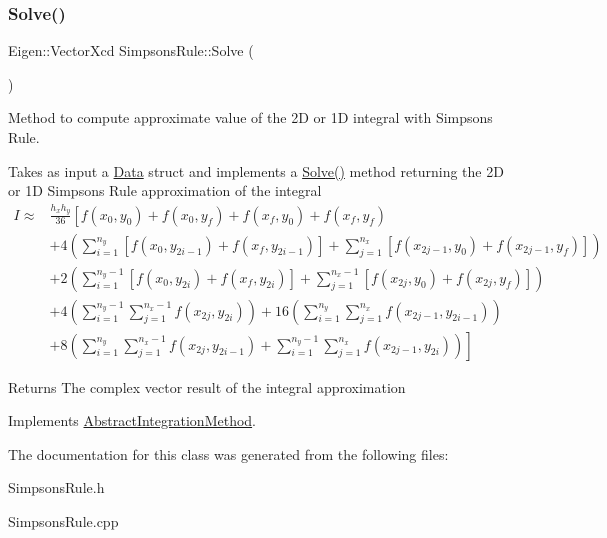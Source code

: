 \subsubsection{\texorpdfstring{Solve()}{Solve()}}
{\footnotesize\ttfamily Eigen\+::\+Vector\+Xcd Simpsons\+Rule\+::\+Solve (\begin{DoxyParamCaption}{ }\end{DoxyParamCaption})\hspace{0.3cm}{\ttfamily [virtual]}}



Method to compute approximate value of the 2D or 1D integral with Simpson\textquotesingle{}s Rule. 

Takes as input a \hyperlink{struct_data}{Data} struct and implements a \hyperlink{class_simpsons_rule_a9925b07e44be9fc1644d3cbeb742078c}{Solve()} method returning the 2D or 1D Simpson\textquotesingle{}s Rule approximation of the integral \begin{eqnarray*} I \approx & \frac{h_x h_y}{36} \left[ f(x_0, y_0)+f(x_0,y_f)+f(x_f,y_0)+f(x_f,y_f) \right.\\ & + 4 \left( \sum_{i=1}^{n_y} \left[f(x_0, y_{2i-1})+f(x_f,y_{2i-1})\right] + \sum_{j=1}^{n_x} \left[f(x_{2j-1}, y_0)+f(x_{2j-1},y_f)\right] \right)\\ & + 2 \left( \sum_{i=1}^{n_y-1} \left[f(x_0, y_{2i})+f(x_f,y_{2i})\right] + \sum_{j=1}^{n_x-1} \left[f(x_{2j}, y_0)+f(x_{2j},y_f)\right] \right) \\ & + 4 \left( \sum_{i=1}^{n_y-1} \sum_{j=1}^{n_x-1} f(x_{2j}, y_{2i}) \right) + 16 \left( \sum_{i=1}^{n_y} \sum_{j=1}^{n_x} f(x_{2j-1}, y_{2i-1}) \right) \\ & \left. +8 \left( \sum_{i=1}^{n_y} \sum_{j=1}^{n_x-1} f(x_{2j}, y_{2i-1}) + \sum_{i=1}^{n_y-1} \sum_{j=1}^{n_x} f(x_{2j-1}, y_{2i}) \right) \right] \end{eqnarray*}

\begin{DoxyReturn}{Returns}
The complex vector result of the integral approximation 
\end{DoxyReturn}


Implements \hyperlink{class_abstract_integration_method_af76e5bdce7d0b139d07e920fa29c1c34}{Abstract\+Integration\+Method}.



The documentation for this class was generated from the following files\+:\begin{DoxyCompactItemize}
\item 
Simpsons\+Rule.\+h\item 
Simpsons\+Rule.\+cpp\end{DoxyCompactItemize}
